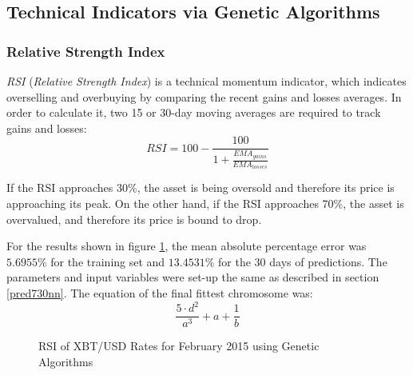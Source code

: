 \documentclass[a4paper,12pt]{article}
\begin{document}
\subsection{Technical Indicators via Genetic Algorithms}
\subsubsection{Relative Strength Index}

	\textit{RSI}\cite{wilder1978new} (\textit{Relative Strength Index}) is a technical momentum indicator, which indicates overselling and overbuying by comparing the recent gains and losses averages. In order to calculate it, two 15 or 30-day moving averages are required to track gains and losses:\\
	$$ RSI = 100 - \frac{100}{1 + \frac{EMA_{gains}}{EMA_{losses}}} $$

	If the RSI approaches 30\%, the asset is being oversold and therefore its price is approaching its peak. On the other hand, if the RSI approaches 70\%, the asset is overvalued, and therefore its price is bound to drop.

	For the results shown in figure \ref{xbt_usd_rsi_february_90}, the mean absolute percentage error was $5.6955\%$ for the training set and $13.4531\%$ for the 30 days of predictions. The parameters and input variables were set-up the same as described in section \ref{pred730nn}. The equation of the final fittest chromosome was:\\
	$$ \frac{5 \cdot d^2}{a^3} + a + \frac{1}{b} $$
	
	\begin{figure}[!htbp]
		\centering
		\caption{RSI of XBT/USD Rates for February 2015 using Genetic Algorithms}
		\label{xbt_usd_rsi_february_90}
	\end{figure}
\end{document}
